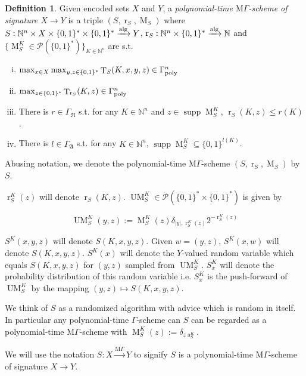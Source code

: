\documentclass{article}
\numberwithin{equation}{section}
\theoremstyle{definition}
\newtheorem{definition}{Definition}[section]
\theoremstyle{plain}
\newcommand{\Bool}{\{0,1\}}
\newcommand{\Words}{{\Bool^*}}
\newcommand{\WordsLen}[1]{{\Bool^{#1}}}
\DeclareMathOperator{\Supp}{supp}
\DeclareMathOperator{\T}{T}
\DeclareMathOperator{\R}{r}
\DeclareMathOperator{\A}{a}
\DeclareMathOperator{\M}{M}
\DeclareMathOperator{\UM}{UM}
\newcommand{\Nats}{\mathbb{N}}
\newcommand{\Abs}[1]{\lvert #1 \rvert}
\newcommand{\GrowR}{\Gamma_{\mathfrak{R}}}
\newcommand{\GrowA}{\Gamma_{\mathfrak{A}}}
\newcommand{\MGrow}{\mathrm{M}\Gamma}
\newcommand{\GammaPoly}{\Gamma_{\textnormal{poly}}}
\newcommand{\Alg}{\xrightarrow{\textnormal{alg}}}
\newcommand{\MScheme}{\xrightarrow{\MGrow}}
\begin{document}
\begin{samepage}
\begin{definition}

Given encoded sets $X$ and $Y$, a \emph{polynomial-time $\MGrow$-scheme of signature ${X \rightarrow Y}$} is a triple $(S,\R_S,\M_S)$ where $S: \Nats^n \times X \times \Words \times \Words \Alg Y$, ${\R_S: \Nats^n \times \Words \Alg \Nats}$ and\\ ${\{\M_S^K \in \mathcal{P}(\Words)\}_{K \in \Nats^n}}$ are s.t.

\begin{enumerate}[(i)]

\item $\max_{x \in X} \max_{y,z \in \Words} \T_S(K,x,y,z) \in \GammaPoly^n$

\item ${\max_{z \in \Words} \T_{\R_S}(K,z) \in \GammaPoly^n}$

\item There is $r \in \GrowR$ s.t. for any $K \in \Nats^n$ and $z \in \Supp \M_S^K$, $\R_S(K,z) \leq r(K)$.

\item There is $l \in \GrowA$ s.t. for any $K \in \Nats^n$, $\Supp \M_S^K \subseteq \WordsLen{l(K)}$.

\end{enumerate}

Abusing notation, we denote the polynomial-time $\MGrow$-scheme $(S,\R_S,\M_S)$ by $S$.

$\R_S^K(z)$ will denote $\R_S(K,z)$. $\UM_S^K \in \mathcal{P}(\Words \times \Words)$ is given by 

\[\UM_S^K(y,z):= \M_S^K(z) \delta_{\Abs{y},\R_S^K(z)} 2^{-\R_S^K(z)}\]

$S^K(x,y,z)$ will denote $S(K,x,y,z)$. Given $w=(y,z)$, $S^K(x,w)$ will denote $S(K,x,y,z)$. $S^K(x)$ will denote the $Y$-valued random variable which equals $S(K,x,y,z)$ for $(y,z)$ sampled from $\UM_S^K$. $S_x^K$ will denote the probability distribution of this random variable i.e. $S_x^K$ is the push-forward of $\UM_S^K$ by the mapping $(y,z) \mapsto S(K,x,y,z)$.

We think of $S$ as a randomized algorithm with advice which is random in itself. In particular any polynomial-time $\Gamma$-scheme can $S$ can be regarded as a polynomial-time $\MGrow$-scheme with $\M_S^K(z):=\delta_{z\A_S^K}$.

We will use the notation $S: X \MScheme Y$ to signify $S$ is a polynomial-time $\MGrow$-scheme of signature $X \rightarrow Y$.

\end{definition}
\end{samepage}
\end{document}
